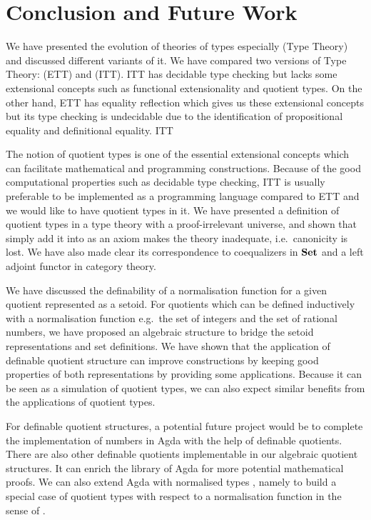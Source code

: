 \chapter{Conclusion and Future Work}

We have presented the evolution of theories of types especially \mltt (Type Theory) and discussed different variants of it.  We have compared two versions of Type Theory: \ett (ETT) and \itt (ITT). ITT has decidable type checking but lacks some extensional concepts such as functional extensionality and quotient types. On the other hand,  ETT has equality reflection which gives us these extensional concepts but its type checking is undecidable due to the identification of propositional equality and definitional equality.
ITT


The notion of quotient types is one of the essential extensional concepts which can facilitate mathematical and programming constructions. Because of the good computational properties such as decidable type checking, ITT is usually preferable to be implemented as a programming language compared to ETT and we would like to have quotient types in it. We have presented a definition of quotient types in a type theory with a proof-irrelevant universe, and shown that simply add it into \itt as an axiom makes the theory inadequate, i.e.\ canonicity is lost. We have also made clear its correspondence to coequalizers in $\operatorname{\mathbf{Set}}$ and a left adjoint functor in category theory.


We have discussed the definability of a normalisation function for a given quotient represented as a setoid. For quotients which can be defined inductively with a normalisation function e.g.\ the set of integers and the set of rational numbers, we have proposed an algebraic structure to bridge the setoid representations and set definitions.
We have shown that the application of definable quotient structure can improve constructions by keeping good properties of both representations by providing some applications. Because it can be seen as a simulation of quotient types, we can also expect similar benefits from the applications of quotient types.


For definable quotient structures, a potential future project would be to complete the implementation of numbers in Agda with the help of definable quotients. There are also other definable quotients implementable in our algebraic quotient structures. It can enrich the library of Agda for more potential mathematical proofs. We can also extend Agda with normalised types \cite{cou:01}, namely to build a special case of quotient types with respect to a normalisation function in the sense of . 

